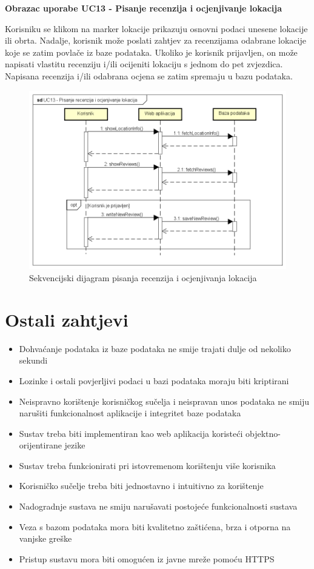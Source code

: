 			\pagebreak \noindent \textbf{Obrazac uporabe UC13 - Pisanje recenzija i ocjenjivanje lokacija}
			
			Korisniku se klikom na marker lokacije prikazuju osnovni podaci unesene lokacije ili obrta. Nadalje, korisnik može poslati zahtjev za recenzijama odabrane lokacije koje se zatim povlače iz baze podataka. Ukoliko je korisnik prijavljen, on može napisati vlastitu recenziju i/ili ocijeniti lokaciju s jednom do pet zvjezdica. Napisana recenzija i/ili odabrana ocjena se zatim spremaju u bazu podataka.
			
			\begin{figure}[H]
				\centering
				\includegraphics[width=\textwidth]{img/UC13-Pisanje_recenzija_i_ocjenjivanje_lokacija.png}
				\caption{Sekvencijski dijagram pisanja recenzija i ocjenjivanja lokacija}
			\end{figure}
    
    \pagebreak \section{Ostali zahtjevi}
	\begin{itemize}
		\item Dohvaćanje podataka iz baze podataka ne smije trajati dulje od nekoliko sekundi
		\item Lozinke i ostali povjerljivi podaci u bazi podataka moraju biti kriptirani
		\item Neispravno korištenje korisničkog sučelja i neispravan unos podataka ne smiju narušiti funkcionalnost aplikacije i integritet baze podataka
		\item Sustav treba biti implementiran kao web aplikacija koristeći objektno-orijentirane jezike
		\item Sustav treba funkcionirati pri istovremenom korištenju više korisnika
		\item Korisničko sučelje treba biti jednostavno i intuitivno za korištenje
		\item Nadogradnje sustava ne smiju narušavati postojeće funkcionalnosti sustava
		\item Veza s bazom podataka mora biti kvalitetno zaštićena, brza i otporna na vanjske greške
		\item Pristup sustavu mora biti omogućen iz javne mreže pomoću HTTPS
	\end{itemize}